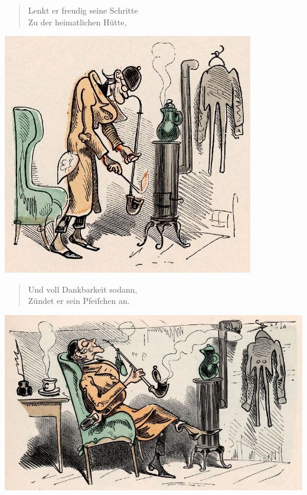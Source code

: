 \documentclass[a4paper,12pt]{article}
\begin{document}
\begin{verse}
Lenkt er freudig seine Schritte\\{}
Zu der heimatlichen Hütte,
\end{verse}



\begin{center}\includegraphics[scale=.7, alt={die Pfeife wird angezündet}]{images/4-06.jpg}\end{center}



\begin{verse}
Und voll Dankbarkeit sodann,\\{}
Zündet er sein Pfeifchen an.
\end{verse}



\begin{center}\includegraphics[scale=.7, alt={... und man ist zufrieden}]{images/4-07.jpg}\end{center}
\end{document}
